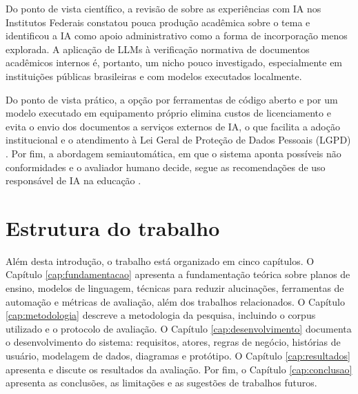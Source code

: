 Do ponto de vista científico, a revisão de  sobre as experiências com IA nos Institutos Federais constatou pouca produção acadêmica sobre o tema e identificou a IA como apoio administrativo como a forma de incorporação menos explorada. A aplicação de LLMs à verificação normativa de documentos acadêmicos internos é, portanto, um nicho pouco investigado, especialmente em instituições públicas brasileiras e com modelos executados localmente.

Do ponto de vista prático, a opção por ferramentas de código aberto e por um modelo executado em equipamento próprio elimina custos de licenciamento e evita o envio dos documentos a serviços externos de IA, o que facilita a adoção institucional e o atendimento à Lei Geral de Proteção de Dados Pessoais (LGPD) \cite{Brasil2018}. Por fim, a abordagem semiautomática, em que o sistema aponta possíveis não conformidades e o avaliador humano decide, segue as recomendações de uso responsável de IA na educação \cite{USDeptEd2023, Pedro2019}.

\section{Estrutura do trabalho}

Além desta introdução, o trabalho está organizado em cinco capítulos. O Capítulo \ref{cap:fundamentacao} apresenta a fundamentação teórica sobre planos de ensino, modelos de linguagem, técnicas para reduzir alucinações, ferramentas de automação e métricas de avaliação, além dos trabalhos relacionados. O Capítulo \ref{cap:metodologia} descreve a metodologia da pesquisa, incluindo o corpus utilizado e o protocolo de avaliação. O Capítulo \ref{cap:desenvolvimento} documenta o desenvolvimento do sistema: requisitos, atores, regras de negócio, histórias de usuário, modelagem de dados, diagramas e protótipo. O Capítulo \ref{cap:resultados} apresenta e discute os resultados da avaliação. Por fim, o Capítulo \ref{cap:conclusao} apresenta as conclusões, as limitações e as sugestões de trabalhos futuros.
